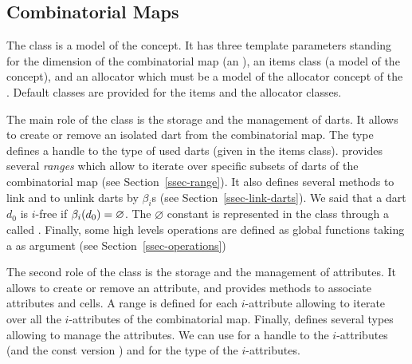\subsection{Combinatorial Maps}\label{ssec-combinatorial-map}
The class  is a model of the
 concept.  It has three template parameters
standing for the dimension of the combinatorial map (an 
), an items class (a model of the 
concept), and an allocator which must be a model of the allocator
concept of the {\stl}.  Default classes are provided for the items and
the allocator classes.

The main role of the class  is the storage and
the management of darts. It allows to create or remove an isolated
dart from the combinatorial map.  The  type defines a
handle to the type of used darts (given in the items class).
 provides several \emph{ranges} which allow to
iterate over specific subsets of darts of the combinatorial map (see
Section~\ref{ssec-range}).  It also defines several methods to link
and to unlink darts by $\beta_i$s (see
Section~\ref{ssec-link-darts}). We said that a dart $d_0$ is $i$-free 
if $\beta_{i}(d_0)=\varnothing$.   The $\varnothing$ constant is
represented in the class  through a 
called \nulldart.  Finally, some high levels
operations are defined as global functions taking a
 as argument (see
Section~\ref{ssec-operations})



The second role of the class  is the storage
and the management of attributes.  It allows to create or remove an
attribute, and provides methods to associate attributes and cells.
A range is defined for each $i$-attribute allowing to iterate
over all the $i$-attributes of the combinatorial map.  Finally,
 defines several types allowing to manage the
attributes. We can use
 for a handle to the
$i$-attributes (and the const version
) and
 for the type of the
$i$-attributes.

